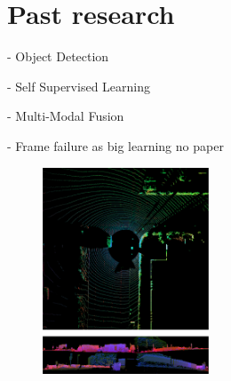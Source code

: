 \begin{minipage}[t]{504pt}
\begin{minipage}[t]{350pt}
\setlength{\parindent}{\myindent}
\setlength{\parskip}{\myparskip}

 \vspace*{-8pt}


 \section{Past research}
 - Object Detection

 - Self Supervised Learning

 - Multi-Modal Fusion
 
 - Frame failure as big learning no paper
 
\vspace*{-6pt}

\end{minipage}
\hspace{13pt}\begin{minipage}[t]{140pt}
\begin{figure}[H]
\includegraphics[width=140pt]{pic/fusion.png}
\end{figure}
\end{minipage}
\end{minipage}

